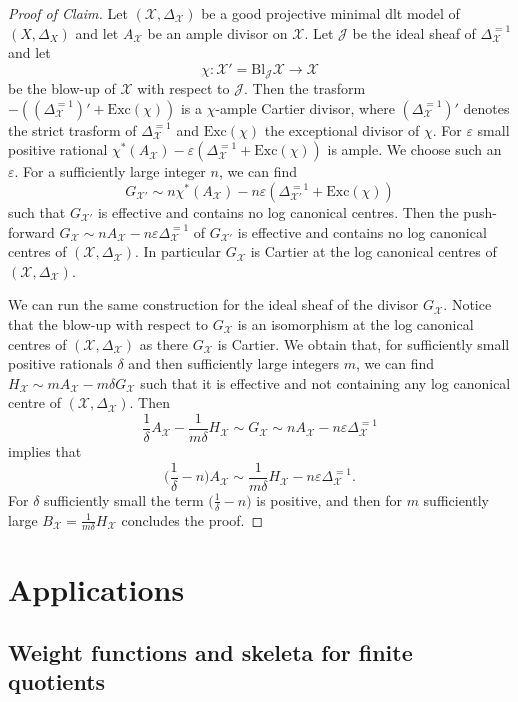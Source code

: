 \documentclass{amsart}%
\numberwithin{equation}{subsection}
\theoremstyle{plain2}
\theoremstyle{definition2}
\theoremstyle{stepstyle}
\theoremstyle{point}
\theoremstyle{subpoint}
\newcommand{\cX}{\ensuremath{\mathscr{X}}}
\begin{document}
\begin{proof}[Proof of Claim]
Let $(\cX,\Delta_{\cX})$ be a good projective minimal dlt model of $(X,\Delta_X)$ and let $A_\cX$ be an ample divisor on $\cX$. Let $\mathcal{J}$ be the ideal sheaf of $\Delta_{\cX}^{=1}$ and let $$\chi: \cX' = \text{Bl}_\mathcal{J}\cX \rightarrow \cX$$ be the blow-up of $\cX$ with respect to $\mathcal{J}$. Then the trasform $- ((\Delta_{\cX}^{=1})'+ \text{Exc}(\chi))$ is a $\chi$-ample Cartier divisor, where $(\Delta_{\cX}^{=1})'$ denotes the strict trasform of $\Delta_{\cX}^{=1}$ and $\text{Exc}(\chi)$ the exceptional divisor of $\chi$. For $\varepsilon$ small positive rational $\chi^*(A_\cX) - \varepsilon (\Delta_{\cX}^{=1} + \text{Exc}(\chi)) $ is ample. We choose such an $\varepsilon$. For a sufficiently large integer $n$, we can find $$G_{\cX'} \sim n \chi^*(A_\cX) - n \varepsilon (\Delta_{\cX'}^{=1} + \text{Exc}(\chi))$$ such that $G_{\cX'}$ is effective and contains no log canonical centres. Then the push-forward $G_\cX \sim n A_\cX - n \varepsilon \Delta_{\cX}^{=1}$ of $G_{\cX'}$ is effective and contains no log canonical centres of $(\cX,\Delta_{\cX})$. In particular $G_\cX$ is Cartier at the log canonical centres of $(\cX,\Delta_{\cX})$.

We can run the same construction for the ideal sheaf of the divisor $G_\cX$. Notice that the blow-up with respect to $G_\cX$ is an isomorphism at the log canonical centres of $(\cX,\Delta_{\cX})$ as there $G_\cX$ is Cartier. We obtain that, for sufficiently small positive rationals $\delta$ and then sufficiently large integers $m$, we can find $H_\cX \sim m A_\cX - m \delta G_\cX$ such that it is effective and not containing any log canonical centre of $(\cX,\Delta_{\cX})$. Then $$\frac{1}{\delta}A_\cX - \frac{1}{m \delta}H_\cX \sim G_\cX \sim n A_\cX - n \varepsilon \Delta_{\cX}^{=1} $$ implies that  $$ \Big(\frac{1}{\delta} - n\Big) A_\cX  \sim \frac{1}{m \delta} H_\cX - n \varepsilon  \Delta_{\cX}^{=1}.$$ For $\delta$ sufficiently small the term $\big(\frac{1}{\delta} - n\big)$ is positive, and then for $m$ sufficiently large $B_\cX = \frac{1}{m \delta} H_\cX$ concludes the proof.
\end{proof}

\section{Applications}
\subsection{Weight functions and skeleta for finite quotients}
\end{document}
